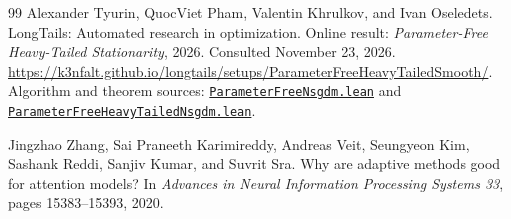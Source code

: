 \documentclass[11pt,a4paper]{article}
\theoremstyle{definition}
\theoremstyle{remark}
\begin{document}
\begin{thebibliography}{99}
Alexander Tyurin, QuocViet Pham, Valentin Khrulkov, and Ivan Oseledets.
\newblock LongTails: Automated research in optimization.
\newblock Online result: \emph{Parameter-Free Heavy-Tailed Stationarity},
2026. Consulted November 23, 2026.
\newblock \url{https://k3nfalt.github.io/longtails/setups/ParameterFreeHeavyTailedSmooth/}.
\newblock Algorithm and theorem sources:
\href{https://github.com/k3nfalt/longtails/blob/main/LongTails/Algorithms/ParameterFreeNsgdm.lean}{\texttt{ParameterFreeNsgdm.lean}} and
\href{https://github.com/k3nfalt/longtails/blob/main/LongTails/Theorems/ParameterFreeHeavyTailedNsgdm.lean}{\texttt{ParameterFreeHeavyTailedNsgdm.lean}}.

Jingzhao Zhang, Sai Praneeth Karimireddy, Andreas Veit, Seungyeon Kim,
Sashank Reddi, Sanjiv Kumar, and Suvrit Sra.
\newblock Why are adaptive methods good for attention models?
\newblock In \emph{Advances in Neural Information Processing Systems 33},
pages 15383--15393, 2020.

\end{thebibliography}
\end{document}
